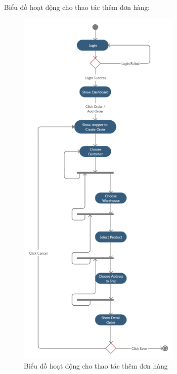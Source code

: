 Biểu đồ hoạt động cho thao tác thêm đơn hàng:
\begin{figure}[H]
\centering
\includegraphics[width=8cm]{images/activity-diagram/add-order.png}
\caption{Biểu đồ hoạt động cho thao tác thêm đơn hàng}
\end{figure}

